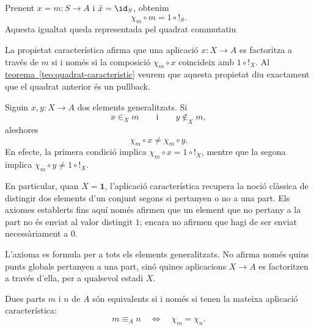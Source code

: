 Prenent \(x=m:S\to A\) i \(\bar{x}=\id_S\), obtenim
\[
\chi_m\circ m=1\circ {!}_S.
\]
Aquesta igualtat queda representada pel quadrat commutatiu
\begin{center}
\end{center}
La propietat característica afirma que una aplicació \(x:X\to A\) es factoritza a través de \(m\) si i només si la composició \(\chi_m\circ x\) coincideix amb \(1\circ {!}_X\). Al \hyperref[teo:quadrat-caracteristic]{teorema~\ref*{teo:quadrat-caracteristic}} veurem que aquesta propietat diu exactament que el quadrat anterior és un pullback.

\begin{observacio}\label{obs:caracteristica-distingeix}
Siguin \(x,y:X\to A\) dos elements generalitzats. Si
\[
x\in_Xm
\qquad\text{i}\qquad
y\notin_Xm,
\]
aleshores
\[
\chi_m\circ x\neq\chi_m\circ y.
\]
En efecte, la primera condició implica \(\chi_m\circ x=1\circ {!}_X\), mentre que la segona implica \(\chi_m\circ y\neq1\circ {!}_X\).

En particular, quan \(X=\mathbf1\), l'aplicació característica recupera la noció clàssica de distingir dos elements d'un conjunt segons si pertanyen o no a una part. Els axiomes establerts fins aquí només afirmen que un element que no pertany a la part no és enviat al valor distingit \(1\); encara no afirmen que hagi de ser enviat necessàriament a \(0\).
\end{observacio}

L'axioma es formula per a tots els elements generalitzats. No afirma només quins punts globals pertanyen a una part, sinó quines aplicacions \(X\to A\) es factoritzen a través d'ella, per a qualsevol estadi \(X\).

\begin{proposicio}\label{prop:caracteristica-determina-part}
Dues parts \(m\) i \(n\) de \(A\) són equivalents si i només si tenen la mateixa aplicació característica:
\[
m\equiv_A n
\quad\Longleftrightarrow\quad
\chi_m=\chi_n.
\]
\end{proposicio}


